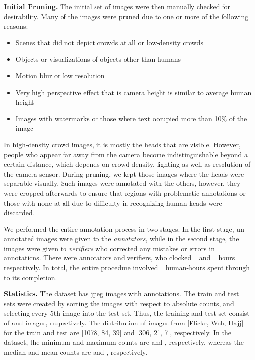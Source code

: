 \documentclass[runningheads]{llncs}
\begin{document}
\noindent\textbf{Initial Pruning.} The initial set of images were then manually checked for desirability. Many of the images were pruned due to one or more of the following reasons:
\begin{itemize}[noitemsep]
  \item Scenes that did not depict crowds at all or low-density crowds
  \item Objects or visualizations of objects other than humans
  \item Motion blur or low resolution
\item Very high perspective effect that is camera height is similar to average human height
  \item Images with watermarks or those where text occupied more than 10\% of the image
\end{itemize}

In high-density crowd images, it is mostly the heads that are visible. However, people who appear far away from the camera become indistinguishable beyond a certain distance, which depends on crowd density, lighting as well as resolution of the camera sensor. During pruning, we kept those images where the heads were separable visually. Such images were annotated with the others, however, they were cropped afterwards to ensure that regions with problematic annotations or those with none at all due to difficulty in recognizing human heads were discarded.







We performed the entire annotation process in two stages. In the first stage, un-annotated images were given to the \textit{annotators}, while in the second stage, the images were given to \textit{verifiers} who corrected any mistakes or errors in annotations. There were  annotators and  verifiers, who clocked ~ and ~ hours respectively. In total, the entire procedure involved ~ human-hours spent through to its completion.
\vskip 0.1in

\noindent\textbf{Statistics.} The dataset has  jpeg images with  annotations. The train and test sets were created by sorting the images with respect to absolute counts, and selecting every 5th image into the test set. Thus, the training and test set consist of  and  images, respectively. The distribution of images from [Flickr, Web, Hajj] for the train and test are [1078, 84, 39] and [306, 21, 7], respectively. In the dataset, the minimum and maximum counts are  and , respectively, whereas the median and mean counts are  and , respectively.
\end{document}
